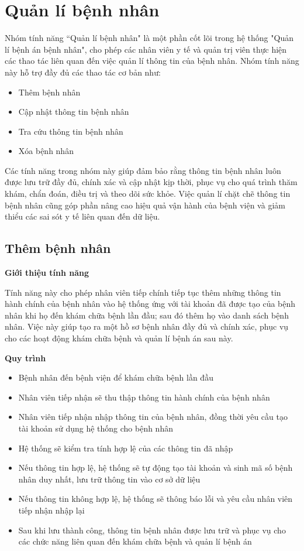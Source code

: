 \section{Quản lí bệnh nhân}

Nhóm tính năng ``Quản lí bệnh nhân" là một phần cốt lõi trong hệ thống "Quản lí bệnh án bệnh nhân", cho phép các nhân viên y tế và quản trị viên thực hiện các thao tác liên quan đến việc quản lí thông tin của bệnh nhân. Nhóm tính năng này hỗ trợ đầy đủ các thao tác cơ bản như:
\begin{itemize}
  \item Thêm bệnh nhân
  \item Cập nhật thông tin bệnh nhân
  \item Tra cứu thông tin bệnh nhân
  \item Xóa bệnh nhân
\end{itemize}

Các tính năng trong nhóm này giúp đảm bảo rằng thông tin bệnh nhân luôn được lưu trữ đầy đủ, chính xác và cập nhật kịp thời, phục vụ cho quá trình thăm khám, chẩn đoán, điều trị và theo dõi sức khỏe. Việc quản lí chặt chẽ thông tin bệnh nhân cũng góp phần nâng cao hiệu quả vận hành của bệnh viện và giảm thiểu các sai sót y tế liên quan đến dữ liệu.

\subsection{Thêm bệnh nhân}

\noindent \textbf{Giới thiệu tính năng}

Tính năng này cho phép nhân viên tiếp chính tiếp tục thêm những thông tin hành chính của bệnh nhân vào hệ thống ứng với tài khoản đã được tạo của bệnh nhân khi họ đến khám chữa bệnh lần đầu; sau đó thêm họ vào danh sách bệnh nhân. Việc này giúp tạo ra một hồ sơ bệnh nhân đầy đủ và chính xác, phục vụ cho các hoạt động khám chữa bệnh và quản lí bệnh án sau này.

\noindent \textbf{Quy trình}

\begin{itemize}

  \item Bệnh nhân đến bệnh viện để khám chữa bệnh lần đầu
  \item Nhân viên tiếp nhận sẽ thu thập thông tin hành chính của bệnh nhân
  \item Nhân viên tiếp nhận nhập thông tin của bệnh nhân, đồng thời yêu cầu tạo tài khoản sử dụng hệ thống cho bệnh nhân
  \item Hệ thống sẽ kiểm tra tính hợp lệ của các thông tin đã nhập
  \item Nếu thông tin hợp lệ, hệ thống sẽ tự động tạo tài khoản và sinh mã số bệnh nhân duy nhất, lưu trữ thông tin vào cơ sở dữ liệu
  \item Nếu thông tin không hợp lệ, hệ thống sẽ thông báo lỗi và yêu cầu nhân viên tiếp nhận nhập lại
  \item Sau khi lưu thành công, thông tin bệnh nhân được lưu trữ và phục vụ cho các chức năng liên quan đến khám chữa bệnh và quản lí bệnh án

\end{itemize}

